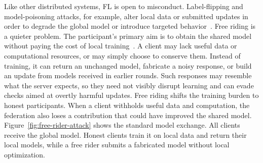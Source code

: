\documentclass[conference]{IEEEtran}
\begin{document}
Like other distributed systems, FL is open to misconduct. Label-flipping and
model-poisoning attacks, for example, alter local data or submitted updates
in order to degrade the global model or introduce targeted
behavior~\cite{kairouz2021advances,bagdasaryan2020backdoor}. Free riding is
a quieter problem. The participant's primary aim is to obtain the shared
model without paying the cost of local
training~\cite{lin2019freeriders,fraboni2021freerider}. A client may lack
useful data or computational resources, or may simply choose to conserve
them. Instead of training, it can return an unchanged model, fabricate a
noisy response, or build an update from models received in earlier rounds.
Such responses may resemble what the server expects, so they need not
visibly disrupt learning and can evade checks aimed at overtly harmful
updates. Free riding shifts the training burden to honest participants. When
a client withholds useful data and computation, the federation also loses a
contribution that could have improved the shared model.
Figure~\ref{fig:free-rider-attack} shows the standard model exchange.
All clients receive the global model. Honest clients train it on local
data and return their local models, while a free rider submits a fabricated
model without local optimization.
\end{document}
